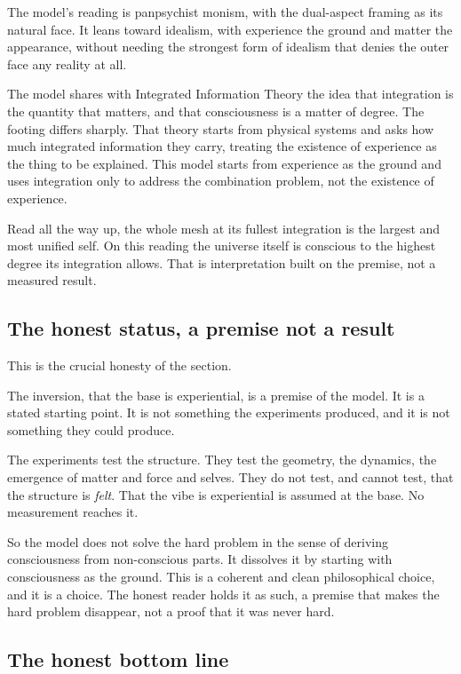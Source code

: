 The model's reading is panpsychist monism, with the dual-aspect framing as its natural face. It leans toward idealism, with experience the ground and matter the appearance, without needing the strongest form of idealism that denies the outer face any reality at all.

The model shares with Integrated Information Theory the idea that integration is the quantity that matters, and that consciousness is a matter of degree. The footing differs sharply. That theory starts from physical systems and asks how much integrated information they carry, treating the existence of experience as the thing to be explained. This model starts from experience as the ground and uses integration only to address the combination problem, not the existence of experience.

Read all the way up, the whole mesh at its fullest integration is the largest and most unified self. On this reading the universe itself is conscious to the highest degree its integration allows. That is interpretation built on the premise, not a measured result.

\subsection{The honest status, a premise not a result}

This is the crucial honesty of the section.

\begin{principle}
The inversion, that the base is experiential, is a premise of the model. It is a stated starting point. It is not something the experiments produced, and it is not something they could produce.
\end{principle}

The experiments test the structure. They test the geometry, the dynamics, the emergence of matter and force and selves. They do not test, and cannot test, that the structure is \emph{felt}. That the vibe is experiential is assumed at the base. No measurement reaches it.

So the model does not solve the hard problem in the sense of deriving consciousness from non-conscious parts. It dissolves it by starting with consciousness as the ground. This is a coherent and clean philosophical choice, and it is a choice. The honest reader holds it as such, a premise that makes the hard problem disappear, not a proof that it was never hard.

\subsection{The honest bottom line}

